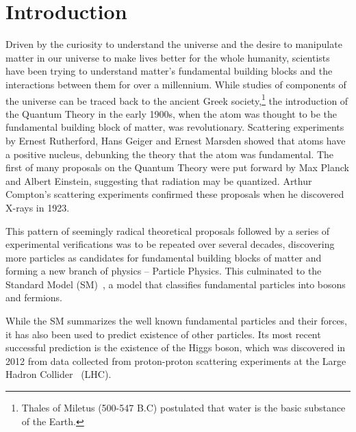 \chapter{Introduction}
\label{intro}
\par Driven by the curiosity to understand the universe and the desire to manipulate 
matter in our universe to make lives better for the whole humanity, scientists 
have been trying to understand matter's fundamental building 
blocks and the interactions between them for over a millennium. 
While studies of components of the universe can be traced back 
to the ancient Greek society,\footnote{Thales of Miletus (500-547 B.C) postulated that 
water is the basic substance of the Earth.} the introduction of the Quantum Theory in the early 1900s,
 when the atom was thought to be the fundamental building block of matter, was revolutionary. 
Scattering experiments by Ernest Rutherford, Hans Geiger and Ernest Marsden showed that 
atoms have a positive nucleus, debunking the theory that the atom was fundamental. The first of many proposals  
on the Quantum Theory were put forward by Max Planck and Albert Einstein, suggesting that radiation may be quantized. 
Arthur Compton's scattering experiments confirmed these proposals when he discovered X-rays in 1923.

\par This pattern of seemingly radical theoretical proposals followed by a series of 
experimental verifications was to be repeated over several decades, discovering more particles 
as candidates for fundamental building blocks of matter and forming a new branch of physics -- Particle 
Physics. This culminated to the Standard Model (SM)~\cite{GLASHOW1961579,PhysRevLett.19.1264}, 
a model that classifies fundamental particles into bosons and fermions.
 
\par While the SM summarizes the well known fundamental particles and their forces, it has also been  
used to predict existence of other particles. Its most recent successful prediction is the existence of 
the Higgs boson, which was discovered in 2012 from data collected from proton-proton scattering 
experiments at the Large Hadron Collider~\cite{Bruning:2004ej} (LHC). 

